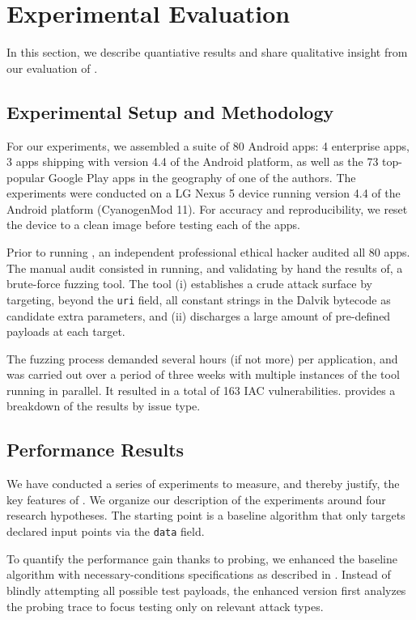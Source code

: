 \section{Experimental Evaluation}\label{Se:evaluation}

In this section, we describe quantiative results and share qualitative insight from our evaluation of \Tool. 

\subsection{Experimental Setup and Methodology}

For our experiments, we assembled a suite of 80 Android apps: 4 enterprise apps, 3 apps shipping with version 4.4 of the Android platform, as well as the 73 top-popular Google Play apps in the geography of one of the authors.
The experiments were conducted on a LG Nexus 5 device running version 4.4 of the Android platform (CyanogenMod 11). For accuracy and reproducibility, we reset the device to a clean image before testing each of the apps.

Prior to running \Tool, an independent professional ethical hacker audited all 80 apps. The manual audit consisted in running, and validating by hand the results of, a brute-force fuzzing tool. The tool (i) establishes a crude attack surface by targeting, beyond the {\tt uri} field, all constant strings in the Dalvik bytecode as candidate extra parameters, and (ii) discharges a large amount of pre-defined payloads at each target.

The fuzzing process demanded several hours (if not more) per application, and was carried out over a period of three weeks with multiple instances of the tool running in parallel. It resulted in a total of 163 IAC vulnerabilities.  provides a breakdown of the results by issue type.

\subsection{Performance Results}

We have conducted a series of experiments to measure, and thereby justify, the key features of \Tool. We organize our description of the experiments around four research hypotheses. The starting point is a baseline algorithm that only targets declared input points via the {\tt data} field.

 To quantify the performance gain thanks to probing, we enhanced the baseline algorithm with necessary-conditions specifications as described in . Instead of blindly attempting all possible test payloads, the enhanced version first analyzes the probing trace to focus testing only on relevant attack types.

